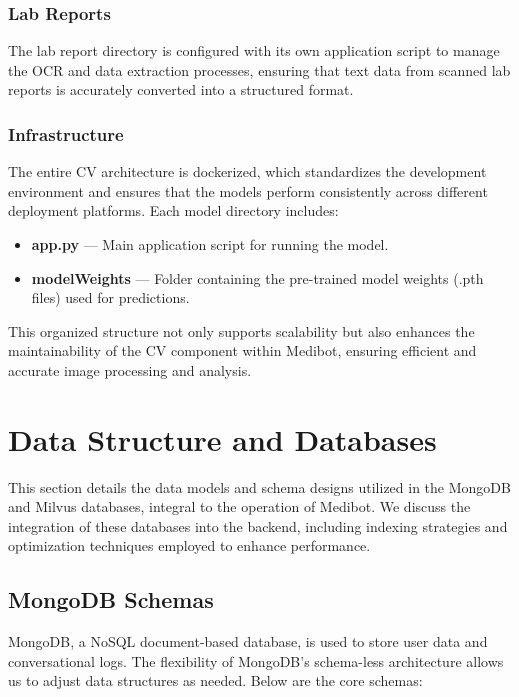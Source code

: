 \subsubsection{Lab Reports}
The lab report directory is configured with its own application script to manage the OCR and data extraction processes, ensuring that text data from scanned lab reports is accurately converted into a structured format.

\subsubsection{Infrastructure}
The entire CV architecture is dockerized, which standardizes the development environment and ensures that the models perform consistently across different deployment platforms. Each model directory includes:
\begin{itemize}
    \item \textbf{app.py} — Main application script for running the model.
    \item \textbf{modelWeights} — Folder containing the pre-trained model weights (.pth files) used for predictions.
\end{itemize}

This organized structure not only supports scalability but also enhances the maintainability of the CV component within Medibot, ensuring efficient and accurate image processing and analysis.


\section{Data Structure and Databases}
This section details the data models and schema designs utilized in the MongoDB and Milvus databases, integral to the operation of Medibot. We discuss the integration of these databases into the backend, including indexing strategies and optimization techniques employed to enhance performance.

\subsection{MongoDB Schemas}
MongoDB, a NoSQL document-based database, is used to store user data and conversational logs. The flexibility of MongoDB's schema-less architecture allows us to adjust data structures as needed. Below are the core schemas:

